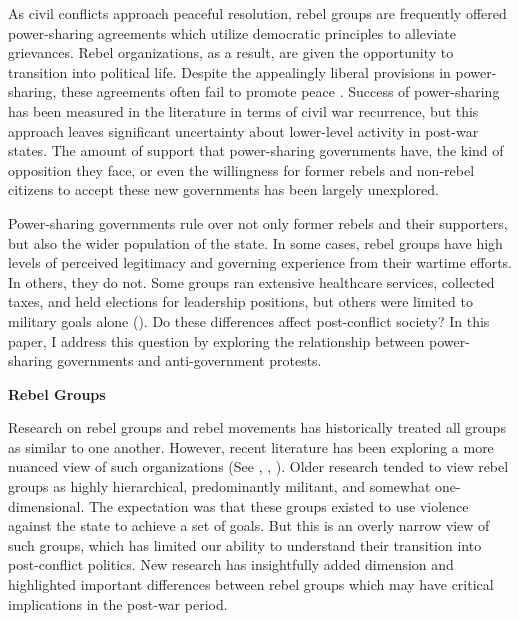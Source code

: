 \documentclass[12pt,]{article}
\begin{document}
\vskip 6.5pt


\noindent \singlespacing As civil conflicts approach peaceful resolution, rebel groups are
frequently offered power-sharing agreements which utilize democratic
principles to alleviate grievances. Rebel organizations, as a result,
are given the opportunity to transition into political life. Despite the
appealingly liberal provisions in power-sharing, these agreements often
fail to promote peace \citeyearpar{mukherjee_why_2006}. Success of
power-sharing has been measured in the literature in terms of civil war
recurrence, but this approach leaves significant uncertainty about
lower-level activity in post-war states. The amount of support that
power-sharing governments have, the kind of opposition they face, or
even the willingness for former rebels and non-rebel citizens to accept
these new governments has been largely unexplored.

Power-sharing governments rule over not only former rebels and their
supporters, but also the wider population of the state. In some cases,
rebel groups have high levels of perceived legitimacy and governing
experience from their wartime efforts. In others, they do not. Some
groups ran extensive healthcare services, collected taxes, and held
elections for leadership positions, but others were limited to military
goals alone (\citet{terpstra_rebel_2017}). Do these differences affect
post-conflict society? In this paper, I address this question by
exploring the relationship between power-sharing governments and
anti-government protests.

\textbf{Rebel Groups}

Research on rebel groups and rebel movements has historically treated
all groups as similar to one another. However, recent literature has
been exploring a more nuanced view of such organizations (See
\citet{huang_wartime_2016}, \citet{stewart_civil_2016},
\citet{terpstra_rebel_2017}). Older research tended to view rebel groups
as highly hierarchical, predominantly militant, and somewhat
one-dimensional. The expectation was that these groups existed to use
violence against the state to achieve a set of goals. But this is an
overly narrow view of such groups, which has limited our ability to
understand their transition into post-conflict politics. New research
has insightfully added dimension and highlighted important differences
between rebel groups which may have critical implications in the
post-war period.
\end{document}
